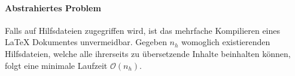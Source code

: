 \paragraph{Abstrahiertes Problem}
Falls auf Hilfsdateien zugegriffen wird, ist das mehrfache Kompilieren eines \LaTeX{} Dokumentes unvermeidbar. Gegeben $n_{h}$ womoglich existierenden Hilfsdateien, welche alle ihrerseits zu übersetzende Inhalte beinhalten können, folgt eine minimale Laufzeit $\mathcal{O}(n_h)$. 




